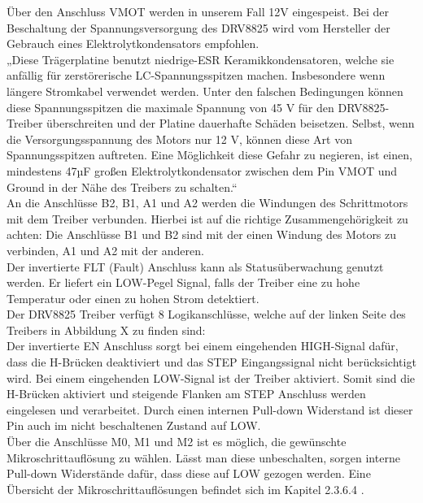 Über den Anschluss VMOT werden in unserem Fall 12V eingespeist.
Bei der Beschaltung der Spannungsversorgung des DRV8825 wird vom Hersteller der Gebrauch eines Elektrolytkondensators empfohlen. \\

„Diese Trägerplatine benutzt niedrige-ESR Keramikkondensatoren, welche sie anfällig für zerstörerische LC-Spannungsspitzen machen.
Insbesondere wenn längere Stromkabel verwendet werden.
Unter den falschen Bedingungen können diese Spannungsspitzen die maximale Spannung von 45 V für den DRV8825-Treiber überschreiten und der Platine dauerhafte Schäden beisetzen.
Selbst, wenn die Versorgungsspannung des Motors nur 12 V, können diese Art von Spannungsspitzen auftreten.
Eine Möglichkeit diese Gefahr zu negieren, ist einen, mindestens 47µF großen Elektrolytkondensator zwischen dem Pin VMOT und Ground in der Nähe des Treibers zu schalten.“ \\

An die Anschlüsse B2, B1, A1 und A2 werden die Windungen des Schrittmotors mit dem Treiber verbunden.
Hierbei ist auf die richtige Zusammengehörigkeit zu achten:
Die Anschlüsse B1 und B2 sind mit der einen Windung des Motors zu verbinden, A1 und A2 mit der anderen. \\

Der invertierte FLT (Fault)  Anschluss kann als Statusüberwachung genutzt werden.
Er liefert ein LOW-Pegel Signal, falls der Treiber eine zu hohe Temperatur oder einen zu hohen Strom detektiert. \\

Der DRV8825 Treiber verfügt 8 Logikanschlüsse, welche auf der linken Seite des Treibers in Abbildung X zu finden sind: \\

Der invertierte EN Anschluss sorgt bei einem eingehenden HIGH-Signal dafür, dass die H-Brücken deaktiviert und das STEP Eingangssignal nicht berücksichtigt wird.
Bei einem eingehenden LOW-Signal ist der Treiber aktiviert.
Somit sind die H-Brücken aktiviert und steigende Flanken am STEP Anschluss werden eingelesen und verarbeitet.
Durch einen internen Pull-down Widerstand ist dieser Pin auch im nicht beschaltenen Zustand auf LOW. \\

Über die Anschlüsse M0, M1 und M2 ist es möglich, die gewünschte Mikroschrittauflösung zu wählen.
Lässt man diese unbeschalten, sorgen interne Pull-down Widerstände dafür, dass diese auf LOW gezogen werden.
Eine Übersicht der Mikroschrittauflösungen befindet sich im Kapitel 2.3.6.4 . \\

